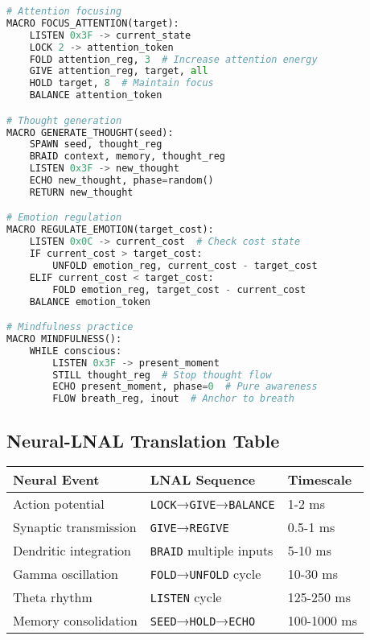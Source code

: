 \documentclass[12pt,a4paper]{article}
\newcommand{\opcmd}[1]{\texttt{#1}}
\begin{document}
\begin{lstlisting}[language=Python, caption=Core Consciousness Macros]
# Attention focusing
MACRO FOCUS_ATTENTION(target):
    LISTEN 0x3F -> current_state
    LOCK 2 -> attention_token
    FOLD attention_reg, 3  # Increase attention energy
    GIVE attention_reg, target, all
    HOLD target, 8  # Maintain focus
    BALANCE attention_token

# Thought generation  
MACRO GENERATE_THOUGHT(seed):
    SPAWN seed, thought_reg
    BRAID context, memory, thought_reg
    LISTEN 0x3F -> new_thought
    ECHO new_thought, phase=random()
    RETURN new_thought

# Emotion regulation
MACRO REGULATE_EMOTION(target_cost):
    LISTEN 0x0C -> current_cost  # Check cost state
    IF current_cost > target_cost:
        UNFOLD emotion_reg, current_cost - target_cost
    ELIF current_cost < target_cost:
        FOLD emotion_reg, target_cost - current_cost
    BALANCE emotion_token

# Mindfulness practice
MACRO MINDFULNESS():
    WHILE conscious:
        LISTEN 0x3F -> present_moment
        STILL thought_reg  # Stop thought flow
        ECHO present_moment, phase=0  # Pure awareness
        FLOW breath_reg, inout  # Anchor to breath
\end{lstlisting}

\subsection{Neural-LNAL Translation Table}

\begin{table}[H]
\centering
\small
\begin{tabular}{lll}
\toprule
\textbf{Neural Event} & \textbf{LNAL Sequence} & \textbf{Timescale} \\
\midrule
Action potential & \opcmd{LOCK}→\opcmd{GIVE}→\opcmd{BALANCE} & 1-2 ms \\
Synaptic transmission & \opcmd{GIVE}→\opcmd{REGIVE} & 0.5-1 ms \\
Dendritic integration & \opcmd{BRAID} multiple inputs & 5-10 ms \\
Gamma oscillation & \opcmd{FOLD}→\opcmd{UNFOLD} cycle & 10-30 ms \\
Theta rhythm & \opcmd{LISTEN} cycle & 125-250 ms \\
Memory consolidation & \opcmd{SEED}→\opcmd{HOLD}→\opcmd{ECHO} & 100-1000 ms \\
\bottomrule
\end{tabular}
\end{table}
\end{document}
